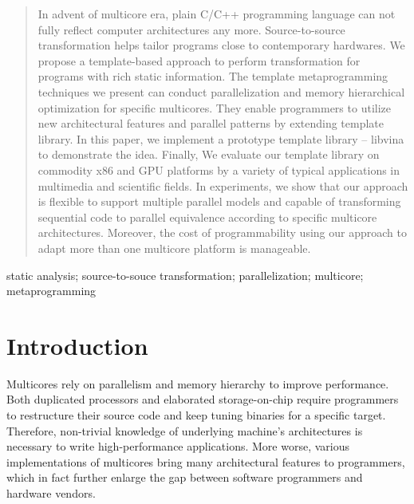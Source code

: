 \documentclass[10pt, conference, compsocconf]{IEEEtran}
\begin{document}
\begin{abstract}
In advent of multicore era, plain C/C++ programming language can not
fully reflect computer architectures any more. Source-to-source
transformation helps tailor programs close to contemporary
hardwares. We propose a template-based approach to perform 
transformation for programs with rich static information.
The template metaprogramming techniques we present can conduct
parallelization and memory hierarchical optimization for specific multicores. They enable
programmers to utilize new architectural
features and parallel patterns by extending template library. 
In this paper, we implement a prototype template library -- libvina
to demonstrate the idea. Finally, We evaluate our template library on
commodity x86 and GPU platforms by a variety of typical applications
in multimedia and scientific fields. In experiments, we show that our
approach is flexible to support multiple parallel models and capable
of transforming sequential code to parallel equivalence  according to
specific multicore architectures. Moreover, the cost of programmability using our
approach to adapt more than one multicore platform is manageable.
\end{abstract}

\begin{IEEEkeywords}
static analysis; source-to-souce transformation; parallelization; multicore; metaprogramming
\end{IEEEkeywords}


%
\IEEEpeerreviewmaketitle

\section{Introduction}
Multicores rely on parallelism and memory
hierarchy to improve performance. Both duplicated processors and
elaborated storage-on-chip require programmers to restructure their
source code and keep tuning binaries for a specific target. Therefore,
non-trivial knowledge of underlying machine's architectures is
necessary to write high-performance applications. More worse, various
implementations of multicores bring many architectural
features to programmers, which in fact further enlarge the gap between software
programmers and hardware vendors.
\end{document}
